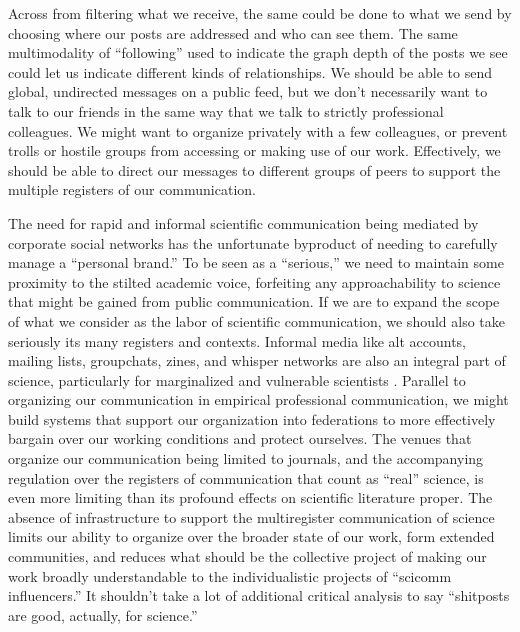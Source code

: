 Across from filtering what we receive, the same could be done to what we
send by choosing where our posts are addressed and who can see them. The
same multimodality of ``following'' used to indicate the graph depth of
the posts we see could let us indicate different kinds of relationships.
We should be able to send global, undirected messages on a public feed,
but we don't necessarily want to talk to our friends in the same way
that we talk to strictly professional colleagues. We might want to
organize privately with a few colleagues, or prevent trolls or hostile
groups from accessing or making use of our work. Effectively, we should
be able to direct our messages to different groups of peers to support
the multiple registers of our communication.

The need for rapid and informal scientific communication being mediated
by corporate social networks has the unfortunate byproduct of needing to
carefully manage a ``personal brand.'' To be seen as a ``serious,'' we
need to maintain some proximity to the stilted academic voice,
forfeiting any approachability to science that might be gained from
public communication. If we are to expand the scope of what we consider
as the labor of scientific communication, we should also take seriously
its many registers and contexts. Informal media like alt accounts,
mailing lists, groupchats, zines, and whisper networks are also an
integral part of science, particularly for marginalized and vulnerable
scientists \citep{jimenezBorderlandingAcademicResearchers2020} .
Parallel to organizing our communication in empirical professional
communication, we might build systems that support our organization into
federations to more effectively bargain over our working conditions and
protect ourselves. The venues that organize our communication being
limited to journals, and the accompanying regulation over the registers
of communication that count as ``real'' science, is even more limiting
than its profound effects on scientific literature proper. The absence
of infrastructure to support the multiregister communication of science
limits our ability to organize over the broader state of our work, form
extended communities, and reduces what should be the collective project
of making our work broadly understandable to the individualistic
projects of ``scicomm influencers.'' It shouldn't take a lot of
additional critical analysis to say ``shitposts are good, actually, for
science.''

